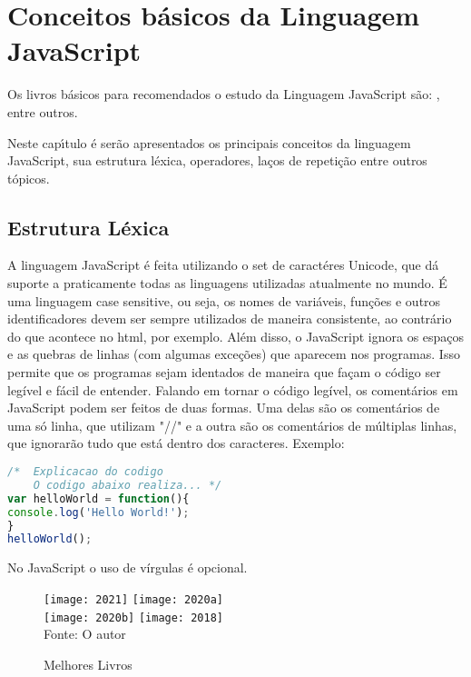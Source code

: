 


\chapter{ Conceitos b\'{a}sicos da Linguagem JavaScript}

Os livros b\'{a}sicos para recomendados o estudo da Linguagem JavaScript s\~{a}o: \cite{Flanagan2020}, \cite{powers2015javascript} entre outros.

Neste cap\'{\i}tulo \'{e} serão apresentados os principais conceitos da linguagem JavaScript, sua estrutura léxica, operadores, laços de repetição entre outros tópicos.


\section{Estrutura Léxica}
A linguagem JavaScript é feita utilizando o set de caractéres Unicode, que dá suporte a praticamente todas as linguagens utilizadas
atualmente no mundo. É uma linguagem case sensitive, ou seja, os nomes de variáveis, funções e outros identificadores devem ser sempre utilizados de maneira consistente, ao contrário do que acontece no html, por exemplo. %
Além disso, o JavaScript ignora os espaços e as quebras de linhas (com algumas exceções) que aparecem nos programas. Isso permite que os programas sejam identados de maneira que façam o código ser legível e fácil de entender.
Falando em tornar o código legível, os comentários em JavaScript podem ser feitos de duas formas. Uma delas são os comentários de uma só linha, que utilizam "//" e a outra são os comentários de múltiplas linhas, que ignorarão tudo que está dentro dos caracteres.
Exemplo:
\newline
\begin{lstlisting}[language=JavaScript]
/*  Explicacao do codigo
	O codigo abaixo realiza... */
var helloWorld = function(){
console.log('Hello World!');
}
helloWorld();
\end{lstlisting}
No JavaScript o uso de vírgulas é opcional.
 


   \begin{figure}[H]
    \begin{center}
        \caption{Melhores Livros} \label{livros}
        \texttt{[image: 2021]} \texttt{[image: 2020a]}\\
                \texttt{[image: 2020b]} \texttt{[image: 2018]}\\
        {\tiny \sf Fonte: O autor }
    \end{center}
   \end{figure} 
